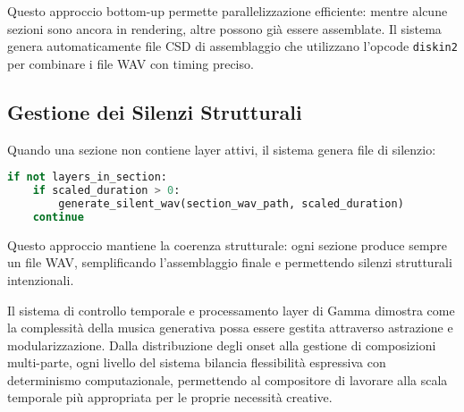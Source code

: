 Questo approccio bottom-up permette parallelizzazione efficiente: mentre alcune sezioni sono ancora in rendering, altre possono già essere assemblate. Il sistema genera automaticamente file CSD di assemblaggio che utilizzano l'opcode \texttt{diskin2} per combinare i file WAV con timing preciso.
\subsection{Gestione dei Silenzi Strutturali}
Quando una sezione non contiene layer attivi, il sistema genera file di silenzio:

\begin{lstlisting}[language=Python]
if not layers_in_section:
    if scaled_duration > 0:
        generate_silent_wav(section_wav_path, scaled_duration)
    continue
\end{lstlisting}

Questo approccio mantiene la coerenza strutturale: ogni sezione produce sempre un file WAV, semplificando l'assemblaggio finale e permettendo silenzi strutturali intenzionali.

Il sistema di controllo temporale e processamento layer di Gamma dimostra come la complessità della musica generativa possa essere gestita attraverso astrazione e modularizzazione. Dalla distribuzione degli onset alla gestione di composizioni multi-parte, ogni livello del sistema bilancia flessibilità espressiva con determinismo computazionale, permettendo al compositore di lavorare alla scala temporale più appropriata per le proprie necessità creative.